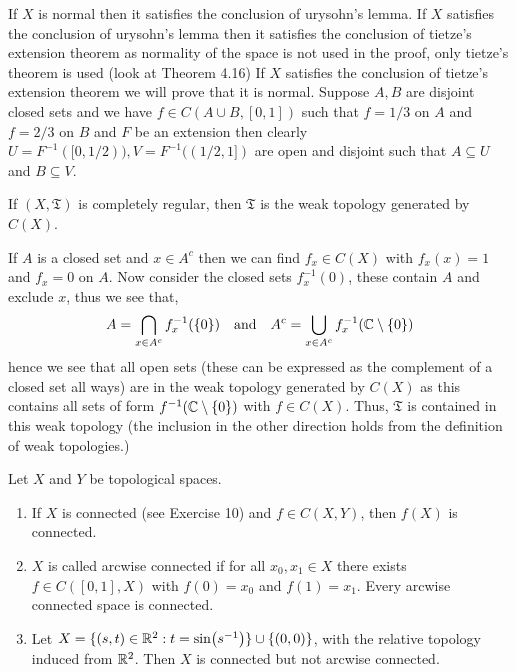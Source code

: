 \documentclass[12pt,a4paper]{article}
\begin{document}
\begin{solution}
If $X$ is normal then it satisfies the conclusion of urysohn's lemma. 
If $X$ satisfies the conclusion of urysohn's lemma then it satisfies the conclusion of tietze's extension theorem as normality of the space is not used in the proof, only tietze's theorem is used (look at Theorem 4.16) 
If $X$ satisfies the conclusion of tietze's extension theorem we will prove that it is normal. 
Suppose $A,B$ are disjoint closed sets and we have $f\in C(A\cup B,[0,1])$ such that $f=1/3$ on $A$ and $f=2/3$ on $B$ and $F$ be an extension then clearly $U=F^{-1}([0,1/2)),V=F^{-1}((1/2,1])$ are open and disjoint such that $A\subseteq U$ and $B\subseteq V.$
\end{solution}
\begin{problem}\label{prob:4-25}
If $(X,\mathfrak{T})$ is completely regular, then $\mathfrak{T}$ is the weak topology generated by $C(X)$.
\end{problem}
\begin{solution}
If $A$ is a closed set and $x\in A^c$ then we can find $f_x\in C(X)$ with $f_x(x)=1$ and $f_x=0$ on $A$. 
Now consider the closed sets $f_x^{-1}( \qty{0})$, these contain $A$ and exclude $x$, thus we see that, 
\[
    A=\bigcap_{x\in A^c}f_x^{-1}( \qty{0})\quad\text{and}\quad A^c=\bigcup_{x\in A^c}f_x^{-1}(\mathbb{C}\setminus \qty{0})
\]
hence we see that all open sets (these can be expressed as the complement of a closed set all ways) are in the weak topology generated by $C(X)$ as this contains all sets of form $f^{-1}(\mathbb{C}\setminus \qty{0})$ with $f\in C(X).$ 
Thus, $\mathfrak T$ is contained in this weak topology (the inclusion in the other direction holds from the definition of weak topologies.)  
\end{solution}
\begin{problem}\label{prob:4-26}
Let $X$ and $Y$ be topological spaces.
\begin{enumerate}[label=\alph*.]
    \item If $X$ is connected (see Exercise 10) and $f \in C(X,Y)$, then $f(X)$ is connected.
    \item $X$ is called arcwise connected if for all $x_0, x_1 \in X$ there exists $f \in C([0,1],X)$ with $f(0) = x_0$ and $f(1) = x_1$. Every arcwise connected space is connected.
    \item Let $X = \{(s,t) \in \mathbb{R}^2 : t = \sin(s^{-1})\} \cup \{(0,0)\}$, with the relative topology induced from $\mathbb{R}^2$. Then $X$ is connected but not arcwise connected.
\end{enumerate}
\end{problem}
\end{document}
